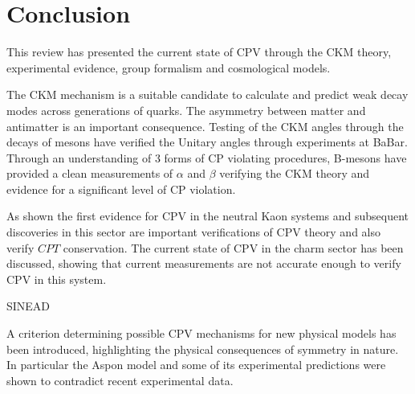 \section{Conclusion}

This review has presented the current state of CPV through the CKM theory, experimental evidence, group formalism and cosmological models. 

The CKM mechanism is a suitable candidate to calculate and predict weak decay modes across generations of quarks. The asymmetry between matter and antimatter is an important consequence. Testing of the CKM angles through the decays of mesons have verified the Unitary angles through experiments at BaBar. Through an understanding of 3 forms of CP violating procedures, B-mesons have provided a clean measurements of $\alpha$ and $\beta$  verifying the CKM theory and evidence for a significant level of CP violation.

As shown the first evidence for CPV in the neutral Kaon systems and subsequent discoveries in this sector are important verifications of CPV theory and also verify $CPT$ conservation. The current state of CPV in the charm sector has been discussed, showing that current measurements are not accurate enough to verify CPV in this system. 

SINEAD

A criterion determining possible CPV mechanisms for new physical models has been introduced, highlighting the physical consequences of symmetry in nature. In particular the Aspon model and some of its experimental predictions were shown to contradict recent experimental data.